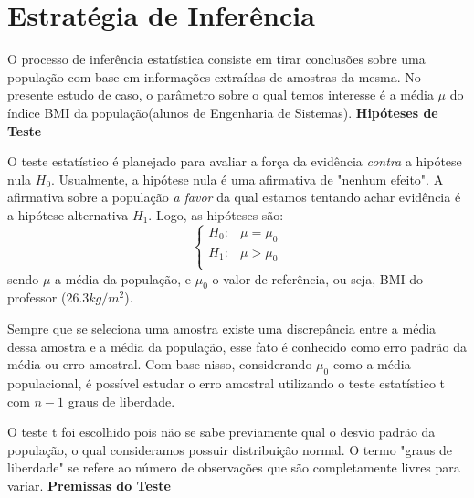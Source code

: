 \documentclass[12pt, a4paper]{article}
\begin{document}
\section{Estratégia de Inferência}
\label{sec:estrategia-inferencia}
O processo de inferência estatística consiste em tirar conclusões sobre uma população com base em informações extraídas de amostras da mesma. No presente estudo de caso, o parâmetro sobre o qual temos interesse é a média $\mu$ do índice BMI da população(alunos de Engenharia de Sistemas).
\newline
\newline
\textbf{Hipóteses de Teste}
\par O teste estatístico é planejado para avaliar a força da evidência \textit{contra} a hipótese nula $H_{0}$. Usualmente, a hipótese nula é uma afirmativa de "nenhum efeito". A afirmativa sobre a população \textit{a favor} da qual estamos tentando achar evidência é a hipótese alternativa $H_{1}$. Logo, as hipóteses são:
\begin{equation}
\left \{
\begin{array}{cc}
H_{0}: & \mu = \mu_{0} \\
H_{1}: & \mu > \mu_{0} \\
\end{array}
\right.
\end{equation}
\newline sendo $\mu$ a média da população, e $\mu_{0}$ o valor de referência, ou seja, BMI do \linebreak professor ($26.3 kg/m^{2}$).
\par Sempre que se seleciona uma amostra existe uma discrepância entre a média dessa amostra e a média da população, esse fato é conhecido como erro padrão da média ou erro amostral. Com base nisso, considerando $\mu_{0}$ como a média populacional, é possível estudar o erro amostral utilizando o teste estatístico t com $n-1$ graus de liberdade.
\par O teste t foi escolhido pois não se sabe previamente qual o desvio padrão da população, o qual consideramos possuir distribuição normal. O termo "graus de liberdade" se refere ao número de observações que são completamente livres para variar.
\newline
\newline
\textbf{Premissas do Teste}
\end{document}
